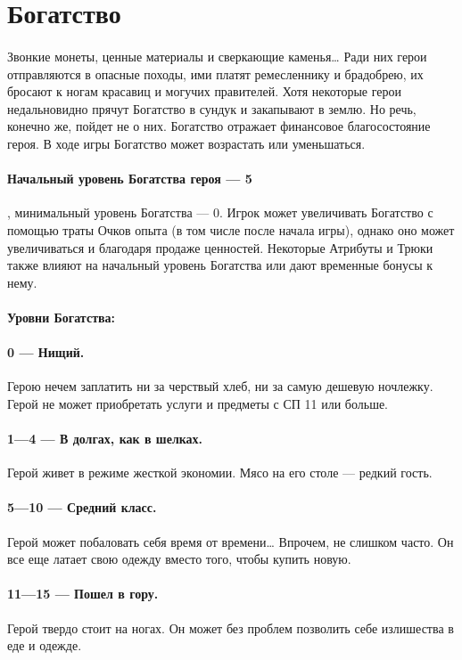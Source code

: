 \section{Богатство}
\paragraph{}
Звонкие монеты, ценные материалы и сверкающие каменья… Ради них герои отправляются в опасные походы, ими платят ремесленнику и брадобрею, их бросают к ногам красавиц и могучих правителей. Хотя некоторые герои недальновидно прячут Богатство в сундук и закапывают в землю. Но речь, конечно же, пойдет не о них.
\newline
Богатство отражает финансовое благосостояние героя. В ходе игры Богатство может возрастать или уменьшаться.
\paragraph{Начальный уровень Богатства героя — 5}, минимальный уровень Богатства — 0. Игрок может увеличивать Богатство с помощью траты Очков опыта (в том числе после начала игры), однако оно может увеличиваться и благодаря продаже ценностей. Некоторые Атрибуты и Трюки также влияют на начальный уровень Богатства или дают временные бонусы к нему.
\paragraph{Уровни Богатства:}
\paragraph{0 — Нищий.} Герою нечем заплатить ни за черствый хлеб, ни за самую дешевую ночлежку. Герой не может приобретать услуги и предметы с СП 11 или больше.
\paragraph{1—4 — В долгах, как в шелках.} Герой живет в режиме жесткой экономии. Мясо на его столе — редкий гость.
\paragraph{5—10 — Средний класс.} Герой может побаловать себя время от времени… Впрочем, не слишком часто. Он все еще латает свою одежду вместо того, чтобы купить новую.
\paragraph{11—15 — Пошел в гору.} Герой твердо стоит на ногах. Он может без проблем позволить себе излишества в еде и одежде.
